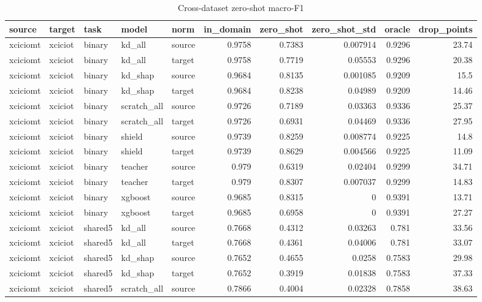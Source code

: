 \begin{table}
\caption{Cross-dataset zero-shot macro-F1}
\begin{tabular}{lllllrrrrr}
\toprule
source & target & task & model & norm & in_domain & zero_shot & zero_shot_std & oracle & drop_points \\
\midrule
xciciomt & xciciot & binary & kd_all & source & 0.9758 & 0.7383 & 0.007914 & 0.9296 & 23.74 \\
xciciomt & xciciot & binary & kd_all & target & 0.9758 & 0.7719 & 0.05553 & 0.9296 & 20.38 \\
xciciomt & xciciot & binary & kd_shap & source & 0.9684 & 0.8135 & 0.001085 & 0.9209 & 15.5 \\
xciciomt & xciciot & binary & kd_shap & target & 0.9684 & 0.8238 & 0.04989 & 0.9209 & 14.46 \\
xciciomt & xciciot & binary & scratch_all & source & 0.9726 & 0.7189 & 0.03363 & 0.9336 & 25.37 \\
xciciomt & xciciot & binary & scratch_all & target & 0.9726 & 0.6931 & 0.04469 & 0.9336 & 27.95 \\
xciciomt & xciciot & binary & shield & source & 0.9739 & 0.8259 & 0.008774 & 0.9225 & 14.8 \\
xciciomt & xciciot & binary & shield & target & 0.9739 & 0.8629 & 0.004566 & 0.9225 & 11.09 \\
xciciomt & xciciot & binary & teacher & source & 0.979 & 0.6319 & 0.02404 & 0.9299 & 34.71 \\
xciciomt & xciciot & binary & teacher & target & 0.979 & 0.8307 & 0.007037 & 0.9299 & 14.83 \\
xciciomt & xciciot & binary & xgboost & source & 0.9685 & 0.8315 & 0 & 0.9391 & 13.71 \\
xciciomt & xciciot & binary & xgboost & target & 0.9685 & 0.6958 & 0 & 0.9391 & 27.27 \\
xciciomt & xciciot & shared5 & kd_all & source & 0.7668 & 0.4312 & 0.03263 & 0.781 & 33.56 \\
xciciomt & xciciot & shared5 & kd_all & target & 0.7668 & 0.4361 & 0.04006 & 0.781 & 33.07 \\
xciciomt & xciciot & shared5 & kd_shap & source & 0.7652 & 0.4655 & 0.0258 & 0.7583 & 29.98 \\
xciciomt & xciciot & shared5 & kd_shap & target & 0.7652 & 0.3919 & 0.01838 & 0.7583 & 37.33 \\
xciciomt & xciciot & shared5 & scratch_all & source & 0.7866 & 0.4004 & 0.02328 & 0.7858 & 38.63 \\

\end{tabular}
\end{table}
